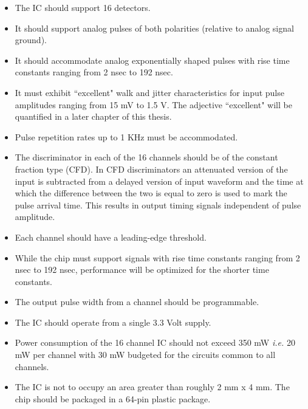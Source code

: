 \documentclass[12pt,oneside,final]{siuethesis}
\theoremstyle{definition}
\begin{document}
\begin{itemize}
\item
The IC should support 16 detectors.
\item
It should support analog pulses of both polarities (relative to analog signal ground).
\item
It should accommodate analog exponentially shaped pulses with rise time constants ranging from 2 nsec to 192 nsec.
\item
It must exhibit ``excellent" walk and jitter characteristics for input pulse amplitudes ranging from 15 mV to 1.5 V. The adjective ``excellent" will be quantified in a later chapter of this thesis.
\item
Pulse repetition rates up to 1 KHz must be accommodated.
\item
The discriminator in each of the 16 channels should be of the constant fraction type (CFD). In CFD discriminators an attenuated version of the input is subtracted from a delayed version of input waveform and the time at which the difference between the two is equal to zero is used to mark the pulse arrival time. This results in output timing signals independent of pulse amplitude.
\item
Each channel should have a leading-edge threshold.
\item
While the chip must support signals with rise time constants ranging from 2 nsec to 192 nsec, performance will be optimized for the shorter time constants. 
\item
The output pulse width from a channel should be programmable.
\item
The IC should operate from a single 3.3 Volt supply.
\item
Power consumption of the 16 channel IC should not exceed 350 mW \emph{i.e.} 20 mW per channel with 30 mW budgeted for the circuits common to all channels. 
\item
The IC is not to occupy an area greater than roughly 2 mm x 4 mm.  The chip should be packaged in a 64-pin plastic package.  

\end{itemize} 
\end{document}
